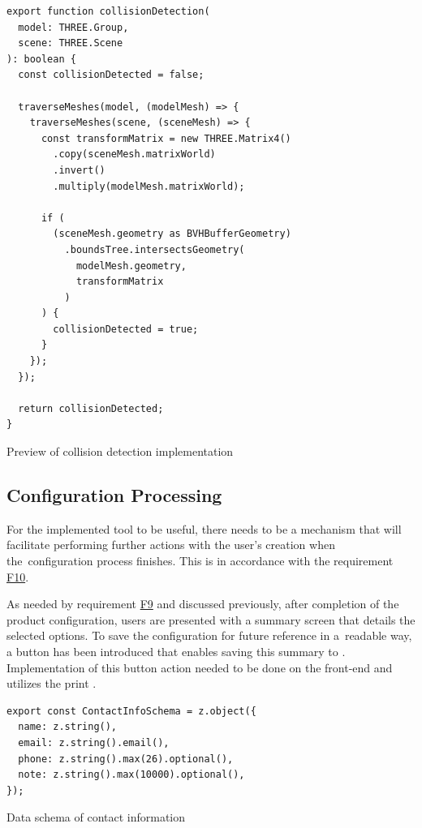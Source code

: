 \begin{listing}[h]
\begin{verbatim}
export function collisionDetection(
  model: THREE.Group,
  scene: THREE.Scene
): boolean {
  const collisionDetected = false;

  traverseMeshes(model, (modelMesh) => {
    traverseMeshes(scene, (sceneMesh) => {
      const transformMatrix = new THREE.Matrix4()
        .copy(sceneMesh.matrixWorld)
        .invert()
        .multiply(modelMesh.matrixWorld);

      if (
        (sceneMesh.geometry as BVHBufferGeometry)
          .boundsTree.intersectsGeometry(
            modelMesh.geometry,
            transformMatrix
          )
      ) {
        collisionDetected = true;
      }
    });
  });

  return collisionDetected;
}
\end{verbatim}
\caption{Preview of collision detection implementation}
\label{lisiting:impl-collisiondetection}
\end{listing}


\subsection{Configuration Processing}

For the implemented tool to be useful, there needs to be a mechanism that will facilitate performing further actions with the user's creation when the~configuration process finishes. This is in accordance with the requirement \hyperref[itm:F10]{F10}.

As needed by requirement \hyperref[itm:F9]{F9} and discussed previously, after completion of the product configuration, users are presented with a summary screen that details the selected options. To save the configuration for future reference in a~readable way, a button has been introduced that enables saving this summary to . Implementation of this button action needed to be done on the front-end and utilizes the  print .

\begin{listing}[h]
\begin{verbatim}
export const ContactInfoSchema = z.object({
  name: z.string(),
  email: z.string().email(),
  phone: z.string().max(26).optional(),
  note: z.string().max(10000).optional(),
});
\end{verbatim}
\caption{Data schema of contact information}
\label{listing:schema-contactinformation}
\end{listing}

